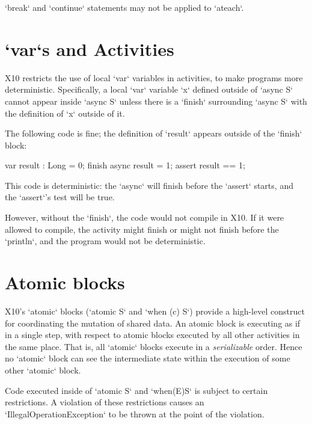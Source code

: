 \xcd`break` and \xcd`continue` statements may not be applied to \xcd`ateach`.

\section{\xcd`var`s and Activities}

X10 restricts the use of local \xcd`var` variables in activities, to make
programs more deterministic. Specifically, a local \xcd`var` variable \xcd`x`
defined outside of \xcd`async S` cannot appear inside \xcd`async S` unless
there is a \xcd`finish` surrounding \xcd`async S` with the definition of
\xcd`x` outside of it.

\begin{ex}
The following code is fine; the definition of \xcd`result` appears outside of
the \xcd`finish` block: 
\begin{xten}
var result : Long = 0;
finish { 
  async result = 1;
}
assert result == 1;
\end{xten}

This code is deterministic: the \xcd`async` will finish before the
\xcd`assert` starts, and the \xcd`assert`'s test will be true.

However, without the \xcd`finish`, the code would not compile in X10.  If it were
allowed to compile, the activity might finish or might not finish before the
\xcd`println`, and the program would not be deterministic.
\end{ex}


\section{Atomic blocks}\label{AtomicBlocks}

X10's \xcd`atomic` blocks (\xcd`atomic S` and \xcd`when (c) S`)
provide a high-level construct for coordinating 
the mutation of shared data. An atomic block is executing as if in a
single step, with respect to atomic blocks executed by all other
activities in the same place. That is, 
all \xcd`atomic` blocks execute in a {\em serializable} order.
Hence no \xcd`atomic` block can see the intermediate state within the
execution of some other \xcd`atomic` block.

Code executed inside of \xcd`atomic S` and \xcd`when(E)S` is subject
to certain restrictions. A violation of these restrictions causes an 
\xcd`IllegalOperationException` to be thrown at the point of the violation.

